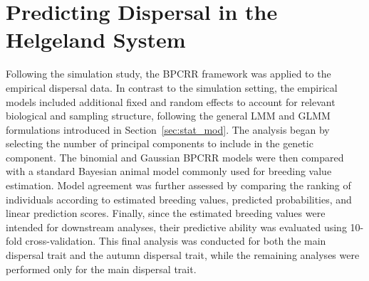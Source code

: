 





\section{Predicting Dispersal in the Helgeland System}

Following the simulation study, the BPCRR framework was applied to the empirical dispersal data. In contrast to the simulation setting, the empirical models included additional fixed and random effects to account for relevant biological and sampling structure, following the general LMM and GLMM formulations introduced in Section~\ref{sec:stat_mod}. The analysis began by selecting the number of principal components to include in the genetic component. The binomial and Gaussian BPCRR models were then compared with a standard Bayesian animal model commonly used for breeding value estimation. Model agreement was further assessed by comparing the ranking of individuals according to estimated breeding values, predicted probabilities, and linear prediction scores. Finally, since the estimated breeding values were intended for downstream analyses, their predictive ability was evaluated using 10-fold cross-validation. This final analysis was conducted for both the main dispersal trait and the autumn dispersal trait, while the remaining analyses were performed only for the main dispersal trait.  


